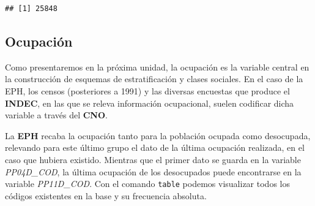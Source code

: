 \documentclass[
]{book}
\newenvironment{Shaded}{\begin{snugshade}}{\end{snugshade}}
\newcommand{\FunctionTok}[1]{\textcolor[rgb]{0.00,0.00,0.00}{#1}}
\newcommand{\NormalTok}[1]{#1}
\newcommand{\SpecialCharTok}[1]{\textcolor[rgb]{0.00,0.00,0.00}{#1}}
\begin{document}
\begin{verbatim}
## [1] 25848
\end{verbatim}

\hypertarget{ocupaciuxf3n-1}{%
\subsection{Ocupación}\label{ocupaciuxf3n-1}}

Como presentaremos en la próxima unidad, la ocupación es la variable central en la construcción de esquemas de estratificación y clases sociales. En el caso de la EPH, los censos (posteriores a 1991) y las diversas encuestas que produce el \textbf{INDEC}, en las que se releva información ocupacional, suelen codificar dicha variable a través del \textbf{CNO}.

La \textbf{EPH} recaba la ocupación tanto para la población ocupada como desocupada, relevando para este último grupo el dato de la última ocupación realizada, en el caso que hubiera existido. Mientras que el primer dato se guarda en la variable \emph{PP04D\_COD}, la última ocupación de los desocupados puede encontrarse en la variable \emph{PP11D\_COD}. Con el comando \texttt{table} podemos visualizar todos los códigos existentes en la base y su frecuencia absoluta.

\begin{Shaded}
\end{Shaded}
\end{document}
